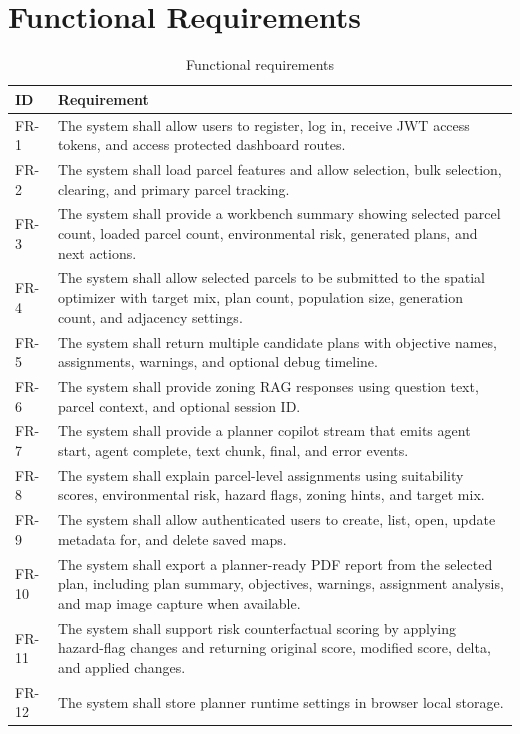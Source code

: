 \documentclass[12pt,a4paper,oneside]{report}
\begin{document}
\section{Functional Requirements}
\begin{longtable}{p{}p{}}
\caption{Functional requirements}\label{tab:functional}\\
\toprule
ID & Requirement \\
\midrule
FR-1 & The system shall allow users to register, log in, receive JWT access tokens, and access protected dashboard routes. \\
FR-2 & The system shall load parcel features and allow selection, bulk selection, clearing, and primary parcel tracking. \\
FR-3 & The system shall provide a workbench summary showing selected parcel count, loaded parcel count, environmental risk, generated plans, and next actions. \\
FR-4 & The system shall allow selected parcels to be submitted to the spatial optimizer with target mix, plan count, population size, generation count, and adjacency settings. \\
FR-5 & The system shall return multiple candidate plans with objective names, assignments, warnings, and optional debug timeline. \\
FR-6 & The system shall provide zoning RAG responses using question text, parcel context, and optional session ID. \\
FR-7 & The system shall provide a planner copilot stream that emits agent start, agent complete, text chunk, final, and error events. \\
FR-8 & The system shall explain parcel-level assignments using suitability scores, environmental risk, hazard flags, zoning hints, and target mix. \\
FR-9 & The system shall allow authenticated users to create, list, open, update metadata for, and delete saved maps. \\
FR-10 & The system shall export a planner-ready PDF report from the selected plan, including plan summary, objectives, warnings, assignment analysis, and map image capture when available. \\
FR-11 & The system shall support risk counterfactual scoring by applying hazard-flag changes and returning original score, modified score, delta, and applied changes. \\
FR-12 & The system shall store planner runtime settings in browser local storage. \\
\bottomrule
\end{longtable}
\end{document}
